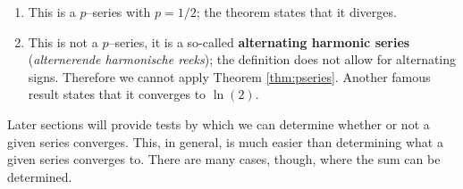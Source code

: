 \begin{example}
\begin{enumerate}
\item		This is a $p$--series with $p=1/2$; the theorem states that it diverges.

\item		This is not a $p$--series, it is a so-called \textbf{alternating harmonic series} (\textit{alternerende harmonische reeks}); the definition does not allow for alternating signs. Therefore we cannot apply Theorem \ref{thm:pseries}. Another famous result states that it  converges to $\ln(2)$.  

\end{enumerate}
\end{example}

\ifanalysis

Later sections will provide tests by which we can determine whether or not a given series converges. This, in general, is much easier than determining what a given series converges to. There are many cases, though, where the sum can be determined. 


